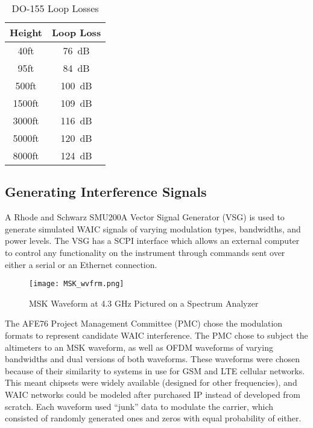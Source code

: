 \begin{table}[]
\centering
\begin{tabular}{|c|c|}
\hline
\textbf{Height} & \textbf{Loop Loss} \\ \hline
40ft            & 76~dB              \\ \hline
95ft            & 84~dB              \\ \hline
500ft           & 100~dB             \\ \hline
1500ft          & 109~dB             \\ \hline
3000ft          & 116~dB             \\ \hline
5000ft          & 120~dB             \\ \hline
8000ft          & 124~dB             \\ \hline
\end{tabular}
\caption{DO-155 Loop Losses}
\label{tab:loop loss}
\end{table}

\subsection{Generating Interference Signals}\label{sub:Generating}
A Rhode and Schwarz SMU200A Vector Signal Generator (VSG) is used to generate simulated WAIC signals of varying modulation types, bandwidths, and power levels. The VSG has a SCPI interface which allows an external computer to control any functionality on the instrument through commands sent over either a serial or an Ethernet connection. 
\begin{figure}[ht]
\centering
\texttt{[image: MSK\_wvfrm.png]}
\caption{MSK Waveform at 4.3 GHz Pictured on a Spectrum Analyzer}

\label{fig:MSK}

\end{figure}

The AFE76 Project Management Committee (PMC) chose the modulation formats to represent candidate WAIC interference. The PMC chose to subject the altimeters to an MSK waveform, as well as OFDM waveforms of varying bandwidths and dual versions of both waveforms. These waveforms were chosen because of their similarity to systems in use for GSM and LTE cellular networks. This meant chipsets were widely available (designed for other frequencies), and WAIC networks could be modeled after purchased IP instead of developed from scratch. Each waveform used ``junk'' data to modulate the carrier, which consisted of randomly generated ones and zeros with equal probability of either.
